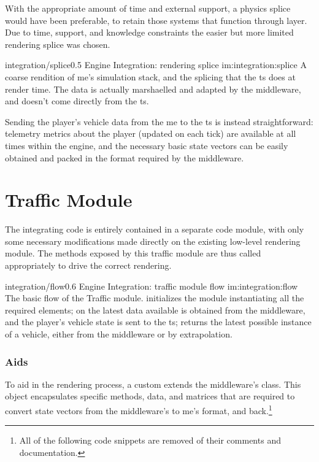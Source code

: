 With the appropriate amount of time and external support, a physics splice would have been preferable, to retain those systems that function through layer. Due to time, support, and knowledge constraints the easier but more limited rendering splice was chosen.

\begin{image}
	{integration/splice}{0.5}
	{Engine Integration: rendering splice}
	{im:integration:splice}
	{}
	{A coarse rendition of \gls{me}'s simulation stack, and the splicing that the \gls{ts} does at render time. The data is actually marshaelled and adapted by the \gls{middleware}, and doesn't come directly from the \gls{ts}.}
\end{image}

Sending the player's vehicle data from the \gls{me} to the \gls{ts} is instead straightforward: telemetry metrics about the player (updated on each tick) are available at all times within the engine, and the necessary basic state vectors can be easily obtained and packed in the format required by the \gls{middleware}.

\section{Traffic Module}\label{sc:integration:trafficmodule}

The integrating code is entirely contained in a separate code module, with only some necessary modifications made directly on the existing low-level rendering module. The methods exposed by this traffic module are thus called appropriately to drive the correct rendering.

\begin{image}
	{integration/flow}{0.6}
	{Engine Integration: traffic module flow}
	{im:integration:flow}
	{}
	{The basic flow of the Traffic module.  initializes the module instantiating all the required elements; on  the latest data available is obtained from the \gls{middleware}, and the player's vehicle state is sent to the \gls{ts};  returns the latest possible instance of a vehicle, either from the \gls{middleware} or by extrapolation.}
\end{image}

\subsubsection{Aids}

To aid in the rendering process, a custom  extends the \gls{middleware}'s  class. This object encapsulates specific methods, data, and matrices that are required to convert state vectors from the \gls{middleware}'s to \gls{me}'s format, and back.\footnote{All of the following code snippets are removed of their comments and documentation.}

